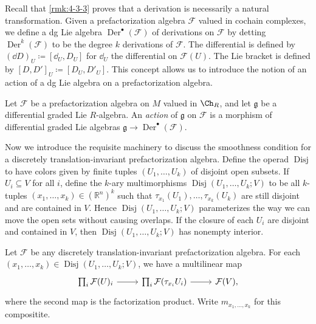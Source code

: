 Recall that \cref{rmk:4-3-3} proves that a derivation is necessarily a natural transformation. Given a prefactorization algebra $\mathcal{F} $ valued in cochain complexes, we define a dg Lie algebra $\operatorname{Der} ^{\bullet} (\mathcal{F} )$ of derivations on $\mathcal{F} $ by detting $\operatorname{Der} ^k(\mathcal{F} )$ to be the degree $k$ derivations of $\mathcal{F} $. The differential is defined by $(\dd D)_U \coloneqq [\dd _U,D_U]$ for $\dd _U$ the differential on $\mathcal{F} (U)$. The Lie bracket is defined by $[D,D']_U \coloneqq [D_U,D'_U]$. This concept allows us to introduce the notion of an action of a dg Lie algebra on a prefactorization algebra.

\begin{definition}\label{dfn:4-8-3}
	Let $\mathcal{F} $ be a prefactorization algebra on $M$ valued in $\Ch_{R} $, and let $\mathfrak{g} $ be a differential graded Lie $R$-algebra. An \emph{action} of $\mathfrak{g} $ on $\mathcal{F} $ is a morphism of differential graded Lie algebras $\mathfrak{g} \to \operatorname{Der} ^{\bullet} (\mathcal{F} )$.
\end{definition}

Now we introduce the requisite machinery to discuss the smoothness condition for a discretely translation-invariant prefactorization algebra. Define the operad $\operatorname{Disj} $ to have colors given by finite tuples $(U_1, \ldots , U_k)$ of disjoint open subsets. If $U_i \subseteq V$ for all $i$, define the $k$-ary multimorphisms $\operatorname{Disj} (U_1, \ldots , U_k; V)$ to be all $k$-tuples $(x_1, \ldots ,x_k)\in(\mathbb{R} ^n)^k$ such that $\tau _{x_1} (U_1), \ldots ,\tau _{x_k} (U_k)$ are still disjoint and are contained in $V$. Hence $\operatorname{Disj} (U_1, \ldots , U_k; V)$ parameterizes the way we can move the open sets without causing overlaps. If the closure of each $U_i$ are disjoint and contained in $V$, then $\operatorname{Disj} (U_1, \ldots , U_k; V)$ has nonempty interior.

Let $\mathcal{F} $ be any discretely translation-invariant prefactorization algebra. For each $(x_1, \ldots ,x_k)\in \operatorname{Disj} (U_1, \ldots , U_k; V)$, we have a multilinear map
\[\begin{tikzcd}[row sep = 2.5em, column sep = 2.5em]
\prod_{i} \mathcal{F} (U)_i\ar[r]  & \prod_{i} \mathcal{F} (\tau _{x_i} U_i)\ar[r]  & \mathcal{F} (V),
\end{tikzcd}\]
where the second map is the factorization product. Write $m_{x_1, \ldots ,x_k} $ for this compositite.

